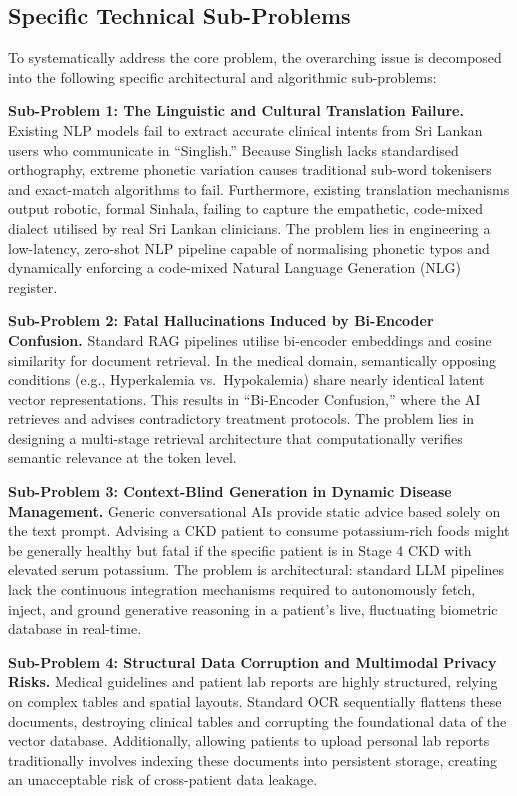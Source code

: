 \documentclass[12pt,a4paper]{report}
\begin{document}
\subsection{Specific Technical Sub-Problems}

To systematically address the core problem, the overarching issue is decomposed into the following specific architectural and algorithmic sub-problems:

\textbf{Sub-Problem 1: The Linguistic and Cultural Translation Failure.}
Existing NLP models fail to extract accurate clinical intents from Sri Lankan users who communicate in ``Singlish.'' Because Singlish lacks standardised orthography, extreme phonetic variation causes traditional sub-word tokenisers and exact-match algorithms to fail. Furthermore, existing translation mechanisms output robotic, formal Sinhala, failing to capture the empathetic, code-mixed dialect utilised by real Sri Lankan clinicians. The problem lies in engineering a low-latency, zero-shot NLP pipeline capable of normalising phonetic typos and dynamically enforcing a code-mixed Natural Language Generation (NLG) register.

\textbf{Sub-Problem 2: Fatal Hallucinations Induced by Bi-Encoder Confusion.}
Standard RAG pipelines utilise bi-encoder embeddings and cosine similarity for document retrieval. In the medical domain, semantically opposing conditions (e.g., Hyperkalemia vs.\ Hypokalemia) share nearly identical latent vector representations. This results in ``Bi-Encoder Confusion,'' where the AI retrieves and advises contradictory treatment protocols. The problem lies in designing a multi-stage retrieval architecture that computationally verifies semantic relevance at the token level.

\textbf{Sub-Problem 3: Context-Blind Generation in Dynamic Disease Management.}
Generic conversational AIs provide static advice based solely on the text prompt. Advising a CKD patient to consume potassium-rich foods might be generally healthy but fatal if the specific patient is in Stage 4 CKD with elevated serum potassium. The problem is architectural: standard LLM pipelines lack the continuous integration mechanisms required to autonomously fetch, inject, and ground generative reasoning in a patient's live, fluctuating biometric database in real-time.

\textbf{Sub-Problem 4: Structural Data Corruption and Multimodal Privacy Risks.}
Medical guidelines and patient lab reports are highly structured, relying on complex tables and spatial layouts. Standard OCR sequentially flattens these documents, destroying clinical tables and corrupting the foundational data of the vector database. Additionally, allowing patients to upload personal lab reports traditionally involves indexing these documents into persistent storage, creating an unacceptable risk of cross-patient data leakage.
\end{document}
